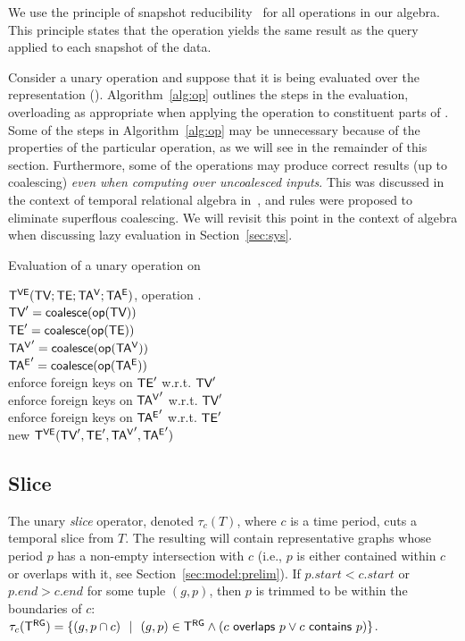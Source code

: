 We use the principle of snapshot
reducibility~\cite{DBLP:reference/db/Bohlen092} for all operations in
our algebra.  This principle states that the operation yields the same
result as the query applied to each snapshot of the data.

Consider a unary operation \op and suppose that it is being evaluated
over the \ve representation \op(\tve).  Algorithm~\ref{alg:op}
outlines the steps in the evaluation, overloading \opp as appropriate
when applying the operation to constituent parts of \tve.  Some of the
steps in Algorithm~\ref{alg:op} may be unnecessary because of the
properties of the particular operation, as we will see in the
remainder of this section.  Furthermore, some of the operations may
produce correct results (up to coalescing) {\em even when computing
  over uncoalesced inputs}.  This was discussed in the context of
temporal relational algebra in~\cite{DBLP:conf/vldb/BohlenSS96}, and
rules were proposed to eliminate superflous coalescing. We will
revisit this point in the context of \tg algebra when discussing lazy
evaluation in Section~\ref{sec:sys}.

\begin{algorithm}[h!]
\caption{Evaluation of a unary operation on \tve}
\begin{algorithmic}[1]
\REQUIRE \tg $\mathsf{T^{VE}} (\textsf{TV}; \textsf{TE}; \mathsf{TA^{V}}; \mathsf{TA^{E}})$, operation .\\
\STATE  $\textsf{TV}' = \textsf{coalesce} (\textsf{op}(\textsf{TV}))$\\
\STATE  $\textsf{TE}' = \textsf{coalesce} (\textsf{op}(\textsf{TE}))$\\
\STATE  $\mathsf{TA^{V}}' = \textsf{coalesce} (\textsf{op}(\mathsf{TA^{V}}))$\\
\STATE  $\mathsf{TA^{E}}' = \textsf{coalesce} (\textsf{op}(\mathsf{TA^{E}}))$\\
\STATE  enforce foreign keys on $\textsf{TE}'$ w.r.t. $\textsf{TV}'$\\
\STATE  enforce foreign keys on $\mathsf{TA^{V}}'$ w.r.t. $\textsf{TV}'$\\
\STATE  enforce foreign keys on $\mathsf{TA^{E}}'$ w.r.t. $\textsf{TE}'$\\
\RETURN new $\mathsf{T^{VE}} (\textsf{TV}', \textsf{TE}', \mathsf{TA^{V}}', \mathsf{TA^{E}}')$\\
\end{algorithmic}
\label{alg:op}
\end{algorithm}

\subsection{Slice}
\label{sec:algebra:slice}

The unary {\em slice} operator, denoted $\tau_c (T)$, where $c$ is a
time period, cuts a temporal slice from $T$.  The resulting \tg will
contain representative graphs whose period $p$ has a non-empty
intersection with $c$ (i.e., $p$ is either contained within $c$ or
overlaps with it, see Section~\ref{sec:model:prelim}).  If $p.start <
c.start$ or $p.end > c.end$ for some tuple $(g, p)$, then $p$ is
trimmed to be within the boundaries of $c$: $\tau_c (\mathsf{T^{RG}}) = \{ (g, p
\cap c)~~|~~(g, p) \in \mathsf{T^{RG}} \wedge (c~\mathsf{overlaps}~p \vee
c~\mathsf{contains}~p)\}$.

